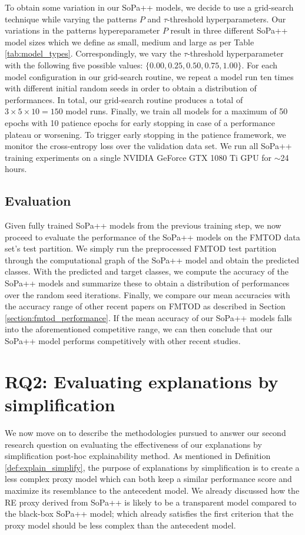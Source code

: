 To obtain some variation in our SoPa++ models, we decide to use a grid-search
technique while varying the patterns $P$ and $\tau$-threshold hyperparameters.
Our variations in the patterns hypereparameter $P$ result in three different
SoPa++ model sizes which we define as small, medium and large as per Table
\ref{tab:model_types}. Correspondingly, we vary the $\tau$-threshold
hyperparameter with the following five possible values: $\{0.00, 0.25, 0.50,
0.75, 1.00\}$. For each model configuration in our grid-search routine, we
repeat a model run ten times with different initial random seeds in order to
obtain a distribution of performances. In total, our grid-search routine
produces a total of $3\times5\times10=150$ model runs. Finally, we train all
models for a maximum of 50 epochs with 10 patience epochs for early stopping in
case of a performance plateau or worsening. To trigger early stopping in the
patience framework, we monitor the cross-entropy loss over the validation data
set. We run all SoPa++ training experiments on a single NVIDIA GeForce GTX 1080
Ti GPU for $\sim$24 hours.

\subsection{Evaluation}

Given fully trained SoPa++ models from the previous training step, we now
proceed to evaluate the performance of the SoPa++ models on the FMTOD data set's
test partition. We simply run the preprocessed FMTOD test partition through the
computational graph of the SoPa++ model and obtain the predicted classes. With
the predicted and target classes, we compute the accuracy of the SoPa++ models
and summarize these to obtain a distribution of performances over the random
seed iterations. Finally, we compare our mean accuracies with the accuracy range
of other recent papers on FMTOD as described in Section
\ref{section:fmtod_performance}. If the mean accuracy of our SoPa++ models
falls into the aforementioned competitive range, we can then conclude that our
SoPa++ model performs competitively with other recent studies.

\section{RQ2: Evaluating explanations by simplification}

\label{section:evaluate_explain}

We now move on to describe the methodologies pursued to answer our second
research question on evaluating the effectiveness of our explanations by
simplification post-hoc explainability method. As mentioned in Definition
\ref{def:explain_simplify}, the purpose of explanations by simplification is to
create a less complex proxy model which can both keep a similar performance
score and maximize its resemblance to the antecedent model. We already discussed
how the RE proxy derived from SoPa++ is likely to be a transparent model
compared to the black-box SoPa++ model; which already satisfies the first
criterion that the proxy model should be less complex than the antecedent model.

